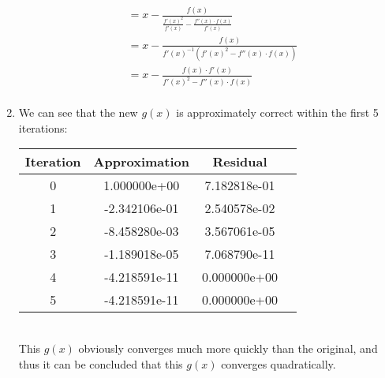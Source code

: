 \documentclass{article}
\begin{document}
\begin{enumerate}[label=\alph*.)]
\begin{align*}
&= x - \frac{f(x)}{\frac{f'(x)^2}{f'(x)} - \frac{f''(x) \cdot f(x)}{f'(x)}} \\
&=  x - \frac{f(x)}{f'(x)^{-1}(f'(x)^2 - f''(x) \cdot f(x))} \\
&= x - \frac{f(x) \cdot f'(x)}{f'(x)^2 - f''(x) \cdot f(x)} \\
\end{align*}
\item We can see that the new $g(x)$ is approximately correct within the first 5 iterations: \\
\begin{tabular}{|c|c|c|c|}
\hline
Iteration & Approximation & Residual\\
\hline
0 & 1.000000e+00 & 7.182818e-01\\
\hline
1 & -2.342106e-01 & 2.540578e-02\\
\hline
2 & -8.458280e-03 & 3.567061e-05\\
\hline
3 & -1.189018e-05 & 7.068790e-11\\
\hline
4 & -4.218591e-11 & 0.000000e+00\\
\hline
5 & -4.218591e-11 & 0.000000e+00\\
\hline
\end{tabular} \\
This $g(x)$ obviously converges much more quickly than the original, and thus it can be concluded that this $g(x)$ converges quadratically. 
\end{enumerate}
\end{document}

